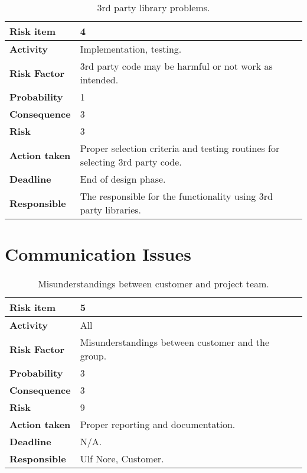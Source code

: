 \begin{table}[htdp]
\begin{center}
\begin{tabularx}{\textwidth}{| X | X |}
\hline
\textbf{Risk item} & 4 \\
\hline
\textbf{Activity} & Implementation, testing.  \\
\hline
\textbf{Risk Factor} & 3rd party code may be harmful or not work as intended. \\
\hline
\textbf{Probability} & 1 \\
\hline
\textbf{Consequence} & 3 \\
\hline
\textbf{Risk} & 3 \\
\hline
\textbf{Action taken} & Proper selection criteria and testing routines for selecting 3rd party code. \\
\hline
\textbf{Deadline} & End of design phase. \\
\hline
\textbf{Responsible} & The responsible for the functionality using 3rd party libraries. \\
\hline
\end{tabularx}
\caption{3rd party library problems.}
\end{center}
\label{risk_7}
\end{table}





\section{Communication Issues}


\begin{table}[htdp]

\begin{center}
\begin{tabularx}{\textwidth}{| X | X |}
\hline
\textbf{Risk item} & 5 \\
\hline
\textbf{Activity} & All  \\
\hline
\textbf{Risk Factor} & Misunderstandings between customer and the group. \\
\hline
\textbf{Probability} & 3 \\
\hline
\textbf{Consequence} & 3 \\
\hline
\textbf{Risk} & 9 \\
\hline
\textbf{Action taken} & Proper reporting and documentation. \\
\hline
\textbf{Deadline} & N/A. \\
\hline
\textbf{Responsible} & Ulf Nore, Customer. \\
\hline
\end{tabularx}
\caption{Misunderstandings between customer and project team.}
\end{center}
\label{risk_8}
\end{table}



